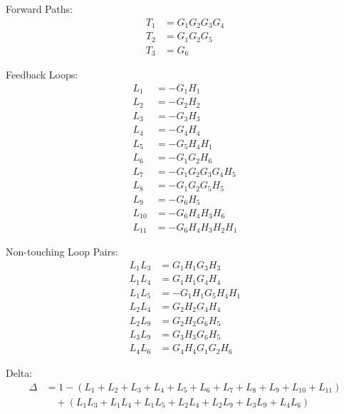 \documentclass[11pt]{article}
\begin{document}
\vspace{0.5em}

Forward Paths:
\begin{align*}
T_1 &= G_1 G_2 G_3 G_4 \\
T_2 &= G_1 G_2 G_5 \\
T_3 &= G_6
\end{align*}

\vspace{0.5em}

Feedback Loops:
\begin{align*}
L_1 &= -G_1 H_1 \\
L_2 &= -G_2 H_2 \\
L_3 &= -G_3 H_3 \\
L_4 &= -G_4 H_4 \\
L_5 &= -G_5 H_4 H_1 \\
L_6 &= -G_1 G_2 H_6 \\
L_7 &= -G_1 G_2 G_3 G_4 H_5 \\
L_8 &= -G_1 G_2 G_5 H_5 \\
L_9 &= -G_6 H_5 \\
L_{10} &= -G_6 H_4 H_3 H_6 \\
L_{11} &= -G_6 H_4 H_3 H_2 H_1
\end{align*}

\vspace{0.5em}

Non-touching Loop Pairs:
\begin{align*}
L_1 L_3 &= G_1 H_1 G_3 H_3 \\
L_1 L_4 &= G_1 H_1 G_4 H_4 \\
L_1 L_5 &= -G_1 H_1 G_5 H_4 H_1 \\
L_2 L_4 &= G_2 H_2 G_4 H_4 \\
L_2 L_9 &= G_2 H_2 G_6 H_5 \\
L_3 L_9 &= G_3 H_3 G_6 H_5 \\
L_4 L_6 &= G_4 H_4 G_1 G_2 H_6
\end{align*}

\vspace{0.5em}

Delta:
{\small
\begin{align*}
\Delta &= 1 - (L_1 + L_2 + L_3 + L_4 + L_5 + L_6 + L_7 + L_8 + L_9 + L_{10} + L_{11}) \\
&\quad + (L_1 L_3 + L_1 L_4 + L_1 L_5 + L_2 L_4 + L_2 L_9 + L_3 L_9 + L_4 L_6)
\end{align*}
}

\vspace{0.5em}
\end{document}
